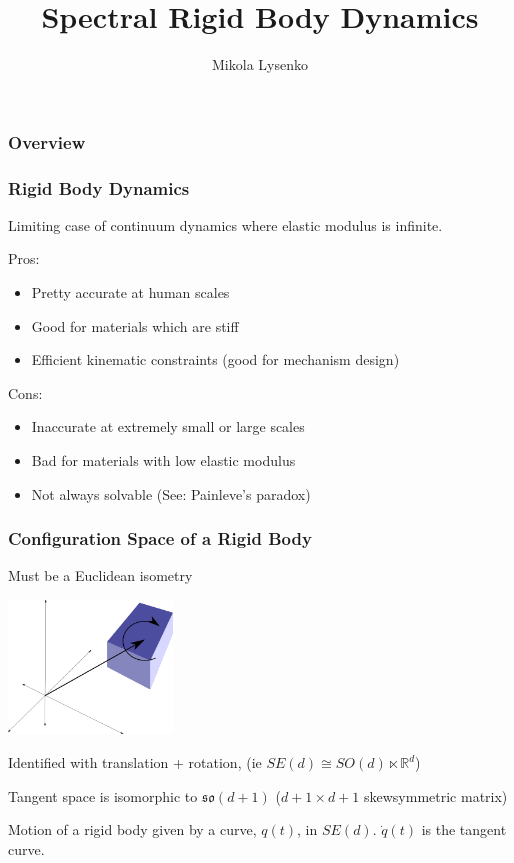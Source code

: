 \documentclass{beamer}
\title{Spectral Rigid Body Dynamics}
\author{Mikola Lysenko}
\begin{document}
\newcommand{\R}{\mathbb{R}}

\maketitle

\begin{frame}
\frametitle{Overview}
\end{frame}

\begin{frame}
\frametitle{Rigid Body Dynamics}
Limiting case of continuum dynamics where elastic modulus is infinite.

Pros:
\begin{itemize}
\item Pretty accurate at human scales
\item Good for materials which are stiff
\item Efficient kinematic constraints (good for mechanism design)
\end{itemize}

Cons:
\begin{itemize}
\item Inaccurate at extremely small or large scales
\item Bad for materials with low elastic modulus
\item Not always solvable (See: Painleve's paradox)
\end{itemize}

\end{frame}

\begin{frame}
\frametitle{Configuration Space of a Rigid Body}
Must be a Euclidean isometry

\begin{center}
\includegraphics[height=1.4in]{figures/rigid_body.png}
\end{center}

Identified with translation + rotation, (ie $SE(d) \cong SO(d) \ltimes \R^d$)

Tangent space is isomorphic to $\mathfrak{so}(d+1)$ ($d+1 \times d+1$ skewsymmetric matrix)

Motion of a rigid body given by a curve, $q(t)$, in $SE(d)$.
	$\dot{q}(t)$ is the tangent curve.
\end{frame}
\end{document}
